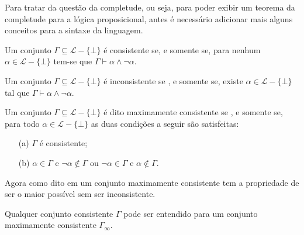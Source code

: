 Para tratar da questão da completude, ou seja, para poder exibir um teorema da completude para a lógica proposicional, antes é necessário adicionar mais alguns conceitos para a sintaxe da linguagem.

\begin{definicao}\label{def:ConjuntoConsistente}
  Um conjunto $\Gamma \subseteq \mathcal{L} - \{\bot\}$ é consistente se, e somente se, para nenhum $\alpha \in \mathcal{L} - \{\bot\}$ tem-se que $\Gamma \vdash \alpha \land \neg \alpha$.
\end{definicao}

\begin{definicao}\label{def:ConjuntoInconsistente}
  Um conjunto $\Gamma \subseteq \mathcal{L} - \{\bot\}$ é inconsistente se , e somente se, existe $\alpha \in \mathcal{L} - \{\bot\}$ tal que $\Gamma \vdash \alpha \land \neg \alpha$.
\end{definicao}

\begin{definicao}\label{def:ConjuntoMaxConsistente}
  Um conjunto $\Gamma \subseteq \mathcal{L} - \{\bot\}$ é dito maximamente consistente se , e somente se, para todo $\alpha \in \mathcal{L} - \{\bot\}$ as duas condições a seguir são satisfeitas:
  \begin{itemize}
      \item[(a)] $\Gamma$ é consistente;
      \item[(b)] $\alpha \in \Gamma$ e $\neg \alpha \notin \Gamma$ ou $\neg \alpha \in \Gamma$ e $\alpha \notin \Gamma$.
  \end{itemize}
\end{definicao}

Agora como dito em \cite{joaoPavao2014} um conjunto maximamente consistente tem a propriedade de ser o maior possível sem ser inconsistente. 

\begin{teorema}\label{teo:ExtensaomaximamenteConsistente}
  Qualquer conjunto consistente $\Gamma$ pode ser entendido para um conjunto maximamente consistente $\Gamma_\infty$.
\end{teorema}

